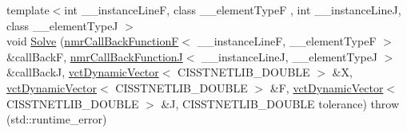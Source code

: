 {\bf }\par
\begin{DoxyCompactItemize}
\item 
{\footnotesize template$<$int \-\_\-\-\_\-instance\-Line\-F, class \-\_\-\-\_\-element\-Type\-F , int \-\_\-\-\_\-instance\-Line\-J, class \-\_\-\-\_\-element\-Type\-J $>$ }\\void \hyperlink{classnmr_l_s_non_lin_jacobian_solver_a2749b26c254243ea8769b96dd565e806}{Solve} (\hyperlink{classnmr_call_back_function_f}{nmr\-Call\-Back\-Function\-F}$<$ \-\_\-\-\_\-instance\-Line\-F, \-\_\-\-\_\-element\-Type\-F $>$ \&call\-Back\-F, \hyperlink{classnmr_call_back_function_j}{nmr\-Call\-Back\-Function\-J}$<$ \-\_\-\-\_\-instance\-Line\-J, \-\_\-\-\_\-element\-Type\-J $>$ \&call\-Back\-J, \hyperlink{classvct_dynamic_vector}{vct\-Dynamic\-Vector}$<$ C\-I\-S\-S\-T\-N\-E\-T\-L\-I\-B\-\_\-\-D\-O\-U\-B\-L\-E $>$ \&X, \hyperlink{classvct_dynamic_vector}{vct\-Dynamic\-Vector}$<$ C\-I\-S\-S\-T\-N\-E\-T\-L\-I\-B\-\_\-\-D\-O\-U\-B\-L\-E $>$ \&F, \hyperlink{classvct_dynamic_vector}{vct\-Dynamic\-Vector}$<$ C\-I\-S\-S\-T\-N\-E\-T\-L\-I\-B\-\_\-\-D\-O\-U\-B\-L\-E $>$ \&J, C\-I\-S\-S\-T\-N\-E\-T\-L\-I\-B\-\_\-\-D\-O\-U\-B\-L\-E tolerance)  throw (std\-::runtime\-\_\-error)
\end{DoxyCompactItemize}

